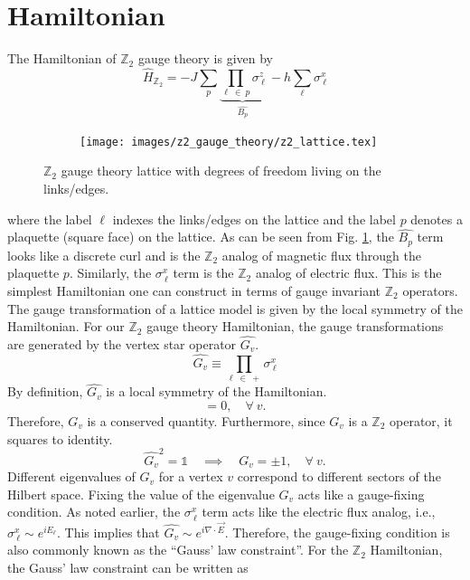 \documentclass[../thesis_main.tex]{subfiles}
\begin{document}
\section{Hamiltonian}
The Hamiltonian of $\mathbb{Z}_2$ gauge theory is given by 
\begin{equation}
    \hat{H}_{\mathbb{Z}_2} = - J \sum_{p} \underbrace{\prod_{\ell \: \in \: p} \sigma^z_{\: \ell}}_{\hat{B_p}} \: - h \sum_{\ell} \sigma^x_{\: \ell}
\end{equation}
\begin{figure}[!htb]
    \centering
    \begin{subfigure}[b]{0.35\textwidth}  %
        \centering
        \texttt{[image: images/z2\_gauge\_theory/z2\_lattice.tex]}
    \end{subfigure}
    \caption{ $\mathbb{Z}_2$ gauge theory lattice with degrees of freedom living on the links/edges.}
    \label{z2_lattice}
\end{figure}
\!\!\!
where the label $\ell$ indexes the links/edges on the lattice and the label $p$ denotes a plaquette (square face) on the lattice. As can be seen from Fig. \ref{z2_lattice}, the $\hat{B_p}$ term looks like a discrete curl and is the $\mathbb{Z}_2$ analog of magnetic flux through the plaquette $p$. Similarly, the $\sigma^x_{\: \ell}$ term is the $\mathbb{Z}_2$ analog of electric flux. This is the simplest Hamiltonian one can construct in terms of gauge invariant $\mathbb{Z}_2$ operators. 
The gauge transformation of a lattice model is given by the local symmetry of the Hamiltonian. For our $\mathbb{Z}_2$ gauge theory Hamiltonian, the gauge transformations are generated by the vertex star operator $\hat{G_v}$.
\begin{equation}
    \hat{G_v} \equiv \prod_{\ell \: \in \: +} \sigma^x_{\: \ell}
\end{equation}
By definition, $\hat{G_v}$ is a local symmetry of the Hamiltonian. 
\begin{equation}
    [\hat{G_v}, \hat{H}] = 0, \quad \forall \: v.
\end{equation}
Therefore, $G_v$ is a conserved quantity. Furthermore, since $G_v$ is a $\mathbb{Z}_2$ operator, it squares to identity.
\begin{equation}
    \hat{G_v}^2 = \mathds{1} \quad \implies \quad G_v = \pm 1, \quad \forall \: v.
\end{equation}    
Different eigenvalues of $G_v$ for a vertex $v$ correspond to different sectors of the Hilbert space. Fixing the value of the eigenvalue $G_v$ acts like a gauge-fixing condition. As noted earlier, the $\sigma^x_{\: \ell}$ term acts like the electric flux analog, i.e., $\sigma^x_{\: \ell} \sim e^{iE_\ell}$. This implies that $\hat{G_v} \sim e^{i \nabla \cdot \vec{E}}$. Therefore, the gauge-fixing condition is also commonly known as the ``Gauss' law constraint''. For the $\mathbb{Z}_2$ Hamiltonian, the Gauss' law constraint can be written as 
\end{document}
